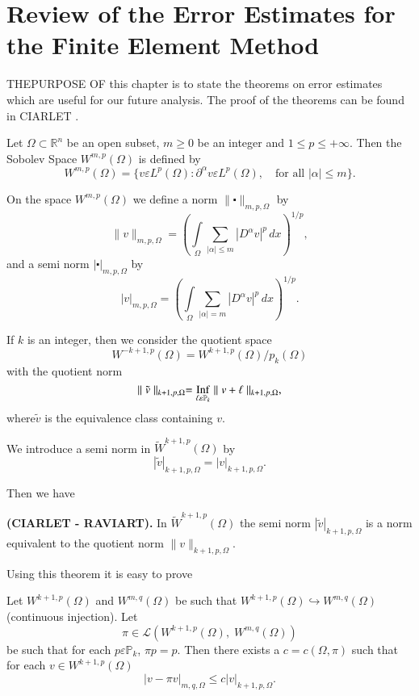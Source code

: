 
\chapter[Review of the Error Estimates for the...]{Review of the Error
  Estimates for the Finite Element  Method}\label{chap5}   

THE\pageoriginale PURPOSE OF this chapter is to state the theorems on
error estimates which are useful for our future analysis. The proof of
the theorems can be found in CIARLET \cite{key9}.

\begin{def*}
Let $\Omega\subset\mathbb{R}^n$ be an open subset, $m\geq 0$ be an
integer and $1\leq p\leq +\infty$. Then the Sobolev Space
$W^{m,p}(\Omega)$ is defined by 
$$
W^{m,p}(\Omega)=\{v\varepsilon L^p(\Omega):\partial^\alpha
v\varepsilon L^p(\Omega),\quad\text{for all } |\alpha |\leq m\}.
$$

On the space $W^{m, p}(\Omega)$ we define a norm $\parallel\centerdot
\parallel_{m,p,\Omega}$ by
$$
\parallel v\parallel_{m,p,\Omega}=\left(\int\limits_\Omega
\sum\limits_{|\alpha |\leq m}|D^\alpha v|^p\,dx\right)^{1/p},
$$
and a semi norm $|\centerdot |_{m,p,\Omega}$ by 
$$
|v|_{m,p,\Omega}=\left(\int\limits_\Omega \sum\limits_{|\alpha
|=m}|D^\alpha v|^p\,dx\right)^{1/p}.
$$

If $k$ is an integer, then we consider the quotient space
$$
W^{-k+1,p}(\Omega)=W^{k+1,p}(\Omega)/p_k(\Omega)
$$
with the quotient norm
$$
\parallel \tilde{v}\parallel_{k+1,p,\Omega}=\underset{\ell\varepsilon
\mathbb{P}_k}{\operatorname{Inf}}\parallel v+\ell\parallel_{k+1,p,\Omega},
$$
where\pageoriginale $\tilde{v}$ is the equivalence class containing
$v$.

We introduce a semi norm in $\tilde{W}^{k+1,p}(\Omega)$ by 
$$
|\tilde{v}|_{k+1,p,\Omega}=|v|_{k+1,p,\Omega}.
$$

Then we have 
\end{def*}

\setcounter{THM}{0}
\begin{THM}\label{chap5:THM1}
{\bf (CIARLET - RAVIART).} In $\tilde{W}^{k+1,p}(\Omega)$ the semi norm
$|\tilde{v}|_{k+1,p,\Omega}$ is a norm equivalent to the quotient norm
$\parallel v\parallel_{k+1,p,\Omega}$.
\end{THM}

Using this theorem it is easy to prove 

\begin{THM}\label{chap5:THM2}
Let $W^{k+1,p}(\Omega)$ and $W^{m,q}(\Omega)$ be such that
$W^{k+1,p}(\Omega)\hookrightarrow W^{m,q}(\Omega)$ (continuous
injection). Let 
$$
\pi\in\mathscr{L}(W^{k+1,p}(\Omega),\;W^{m,q}(\Omega))
$$
be such that for each $p\varepsilon\mathbb{P}_k$, $\pi p=p$. Then
there exists a $c=c(\Omega,\pi)$ such that for each $v\in
W^{k+1,p}(\Omega)$
$$
|v-\pi v|_{m,q,\Omega}\leq c|v|_{k+1,p,\Omega}.
$$
\end{THM}

